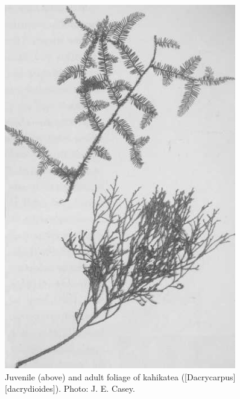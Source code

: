 \begin{figure}[htb]
\begin{minipage}[t]{0.487\textwidth}
    	\includegraphics[width=0.9\textwidth]{graphics/figure22kahikatea.jpg}
    	\caption[Kahikatea foliage]{Juvenile (above) and adult foliage of kahikatea ([Dacrycarpus][dacrydioides]).
    	Photo: J. E. Casey.}%
    	\label{fig:22kahikatea}
	\end{minipage}
\end{figure}

